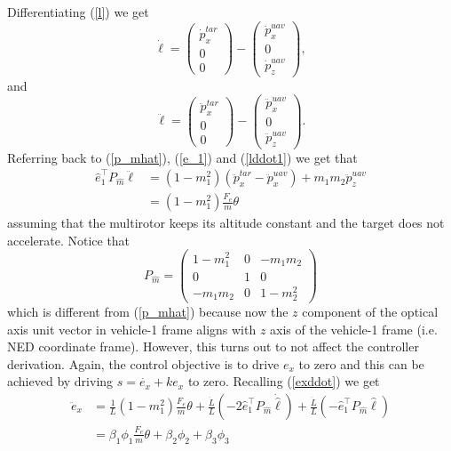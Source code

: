 Differentiating (\ref{l}) we get
\begin{equation}
\dot{\ell}=\begin{pmatrix}
\dot{p}_x^{tar} \\ 0 \\ 0
\end{pmatrix}
-\begin{pmatrix}
\dot{p}_x^{uav} \\ 0 \\ \dot{p}_z^{uav}
\end{pmatrix},
\label{ldot}
\end{equation}
and 
\begin{equation}
\ddot{\ell}=\begin{pmatrix}
\ddot{p}_x^{tar} \\ 0 \\ 0
\end{pmatrix}
-\begin{pmatrix}
\ddot{p}_x^{uav} \\ 0 \\ \ddot{p}_z^{uav}
\end{pmatrix}.
\label{lddot1}
\end{equation}
Referring back to (\ref{p_mhat}), (\ref{e_1}) and (\ref{lddot1}) we get that  
\begin{align}
\hat{e}_1^{\top}P_{\hat{m}}\ddot{\ell}&=(1-m_1^2)(\ddot{p}_x^{tar}-\ddot{p}_x^{uav})+m_1m_2\ddot{p}_z^{uav}
\\&=(1-m_1^2)\frac{F_e}{m}\theta
\end{align}
assuming that the multirotor keeps its altitude constant and the target does not accelerate. Notice that 
\begin{equation}
P_{\hat{m}}=\begin{pmatrix}1-m_1^2 & 0 & -m_1m_2 \\ 0 & 1 & 0 \\ -m_1m_2 & 0 & 1-m_2^2 \end{pmatrix}
\end{equation}
which is different from (\ref{p_mhat}) because now the $z$ component of the optical axis unit vector in vehicle-1 frame aligns with $z$ axis of the vehicle-1 frame (i.e. NED coordinate frame). However, this turns out to not affect the controller derivation.  Again, the control objective is to drive $e_x$ to zero and this can be achieved by driving $s=\dot{e_x}+ke_x$ to zero.
Recalling (\ref{exddot}) we get
\begin{align}
\ddot{e}_x&=\frac{1}{L}(1-m_1^2)\frac{F_e}{m}\theta+\frac{\dot{L}}{L}(-2\hat{e}_1^{\top}P_{\hat{m}}\dot{\hat{\ell}})+\frac{\ddot{L}}{L}(-\hat{e}_1^{\top}P_{\hat{m}}\hat{\ell})
\\&=\beta_1\phi_1\frac{F_e}{m}\theta+\beta_2\phi_2+\beta_3\phi_3
\label{exddot1}
\end{align} 
